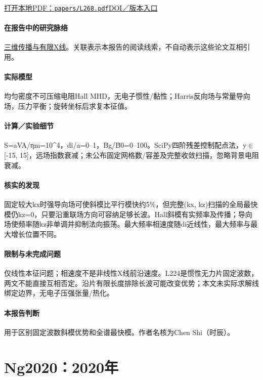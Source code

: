 \documentclass[UTF8,a4paper,11pt,openany,fontset=fandol]{ctexbook}
\begin{document}
\href{run:../papers/L268.pdf}{打开本地PDF：\texttt{papers/L268.pdf}}\quad\href{https://doi.org/10.3847/1538-4357/abb6fa}{DOI／版本入口}

\paragraph{在报告中的研究脉络}\hyperref[story:three]{三维传播与有限X线}。关联表示本报告的阅读线索，不自动表示这些论文互相引用。

\paragraph{实际模型}均匀密度不可压缩电阻Hall MHD，无电子惯性/黏性；Harris反向场与常量导向场，压力平衡；旋转坐标后求复本征值。

\paragraph{计算／实验细节}S=aVA/ηm=10\textasciicircum{}4，di/a=0–1，Bg/B0=0–100。SciPy四阶残差控制配点法，y\ensuremath{\in}[-15, 15]，远场指数衰减；未公布固定网格数/容差及完整收敛扫描，忽略背景电阻衰减。

\paragraph{核实的发现}固定较大kx时强导向场可使斜模比平行模快约5\%，但完整(kx, kz)扫描的全局最快模仍kz=0，只要沿重联场方向可容纳足够长波。Hall斜模有实频率及传播；导向场使频率随kz非单调并抑制法向振荡。最大频率相速度随di近线性，最大频率与最大增长位置不同。

\paragraph{限制与未完成问题}仅线性本征问题；相速度不是非线性X线前沿速度。L224是惯性无力片固定波数，两文不能直接互相否定。沿片有限长度排除长波可能改变优势；本文未实际求解线绑定边界，无电子压强张量/热化。

\paragraph{本报告判断}用于区别固定波数斜模优势和全谱最快模。作者名核为Chen Shi（时辰）。

\section{Ng2020：2020年}\label{paper:Ng2020}
\end{document}
